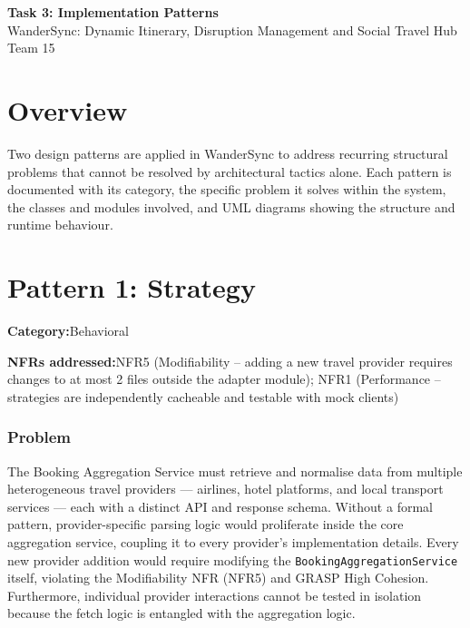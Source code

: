 \documentclass[12pt,a4paper]{article}
\newcommand{\patternfield}[2]{%
  \noindent\textbf{#1:}\hspace{0.5em}#2\par\vspace{0.3em}%
}
\begin{document}
\begin{center}
  {\LARGE\bfseries Task 3: Implementation Patterns}\\[0.4em]
  {\large WanderSync: Dynamic Itinerary, Disruption Management and Social Travel Hub}\\[0.2em]
  {\normalsize Team 15}
\end{center}

\vspace{1em}

\section{Overview}

Two design patterns are applied in WanderSync to address recurring structural problems that
cannot be resolved by architectural tactics alone. Each pattern is documented with its category,
the specific problem it solves within the system, the classes and modules involved, and UML
diagrams showing the structure and runtime behaviour.

\section{Pattern 1: Strategy}

\begin{mdframed}[backgroundcolor=patternbox, linecolor=accent, linewidth=0.8pt]
\patternfield{Category}{Behavioral}
\patternfield{NFRs addressed}{NFR5 (Modifiability -- adding a new travel provider requires changes to at most 2 files outside the adapter module); NFR1 (Performance -- strategies are independently cacheable and testable with mock clients)}
\end{mdframed}

\vspace{0.5em}

\subsubsection{Problem}

The Booking Aggregation Service must retrieve and normalise data from multiple heterogeneous
travel providers — airlines, hotel platforms, and local transport services — each with a
distinct API and response schema. Without a formal pattern, provider-specific parsing logic
would proliferate inside the core aggregation service, coupling it to every provider's
implementation details. Every new provider addition would require modifying the
\texttt{BookingAggregationService} itself, violating the Modifiability NFR (NFR5) and GRASP
High Cohesion. Furthermore, individual provider interactions cannot be tested in isolation
because the fetch logic is entangled with the aggregation logic.
\end{document}
